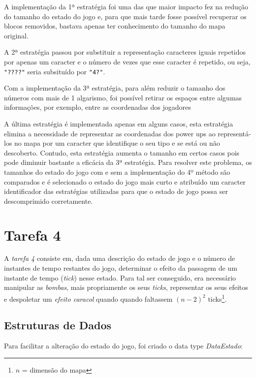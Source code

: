 \documentclass[a4paper]{article}
\begin{document}
A implementação da 1ª estratégia foi uma das que maior impacto fez na redução do tamanho do
estado do jogo e, para que mais tarde fosse possível recuperar os blocos removidos, bastava
apenas ter conhecimento do tamanho do mapa original.

A 2ª estratégia passou por substituir a representação caracteres iguais repetidos por apenas
um caracter e o número de vezes que esse caracter é repetido, ou seja, \texttt{"????"} seria
subsituído por \texttt{"4?"}.

Com a implementação da 3ª estratégia, para além reduzir o tamanho dos números com mais
de 1 algarismo, foi possível retirar os espaços entre algumas informações, por exemplo,
entre as coordenadas dos jogadores

A última estratégia é implementada apenas em alguns casos, esta estratégia elimina a
necessidade de representar as coordenadas dos power ups ao representá-los no mapa por
um caracter que identifique o seu tipo e se está ou não descoberto. Contudo, esta estratégia
aumenta o tamanho em certos casos pois pode diminuir bastante a eficácia da 3ª estratégia.
Para resolver este problema, os tamanhos do estado do jogo com e sem a implementação do 4º
método são comparados e é selecionado o estado do jogo mais curto e atribuído um caracter
identificador das estratégias utilizadas para que o estado de jogo possa ser descomprimido
corretamente.



\section{Tarefa 4}
\label{tarefa4}

A \emph{tarefa 4} consiste em, dada uma descrição do estado de jogo e o número de instantes de tempo restantes do jogo, determinar o efeito da passagem de um instante de tempo (\emph{tick}) nesse estado. Para tal ser conseguido, era necessário manipular as \emph{bombas}, mais propriamente os seus \emph{ticks}, representar os seus efeitos e despoletar um \emph{efeito caracol} quando quando faltassem \((n-2)^2\) ticks\footnote{\(n\) = dimensão do mapa}.

\subsection{Estruturas de Dados}
\label{dadosT4}

Para facilitar a alteração do estado do jogo, foi criado o data type \emph{DataEstado}:
\end{document}
